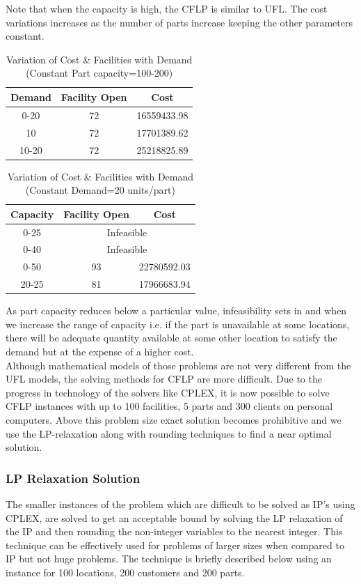 \documentclass[12pt]{article}
\numberwithin{equation}{section}
\begin{document}
Note that when the capacity is high, the CFLP is similar to UFL. The cost variations increases as the number of parts increase keeping the other parameters constant.
\begin{table}[H]
\centering
\caption{Variation of Cost \& Facilities with Demand (Constant Part capacity=100-200)}
\begin{tabular}{|c|c|c|}
\hline
\textbf{Demand} & \textbf{Facility Open} & \textbf{Cost} \\ \hline
0-20 & 72 & 16559433.98 \\ \hline
10 & 72 & 17701389.62 \\ \hline
10-20 & 72 & 25218825.89 \\ \hline
\end{tabular}
\end{table}
\begin{table}[H]
\centering
\caption{Variation of Cost \& Facilities with Demand (Constant Demand=20 units/part)}
\begin{tabular}{|c|c|c|}
\hline
\textbf{Capacity} & \textbf{Facility Open} & \textbf{Cost} \\ \hline
0-25 & \multicolumn{2}{c|}{Infeasible} \\ \hline
0-40 & \multicolumn{2}{c|}{Infeasible} \\ \hline
0-50 & 93 & 22780592.03 \\ \hline
20-25 & 81 & 17966683.94 \\ \hline
\end{tabular}
\end{table}
As part capacity reduces below a particular value, infeasibility sets in and when we increase the range of capacity i.e. if the part is unavailable at some locations, there will be adequate quantity available at some other location to satisfy the demand but at the expense of a higher cost.\\
Although mathematical models of those problems are not very different from the UFL models, the solving methods for CFLP are more difficult. Due to the progress in technology of the solvers like CPLEX, it is now possible to solve CFLP instances with up to 100 facilities, 5 parts and 300 clients on personal computers. Above this problem size exact solution becomes prohibitive and we use the LP-relaxation along with rounding techniques to find a near optimal solution. \\
\subsubsection{LP Relaxation Solution}
The smaller instances of the problem which are difficult to be solved as IP’s using CPLEX, are solved to get an acceptable bound by solving the LP relaxation of the IP and then rounding the non-integer variables to the nearest integer. This technique can be effectively used for problems of larger sizes when compared to IP but not huge problems. The technique is briefly described below using an instance for 100 locations, 200 customers and 200 parts.\\
\end{document}
